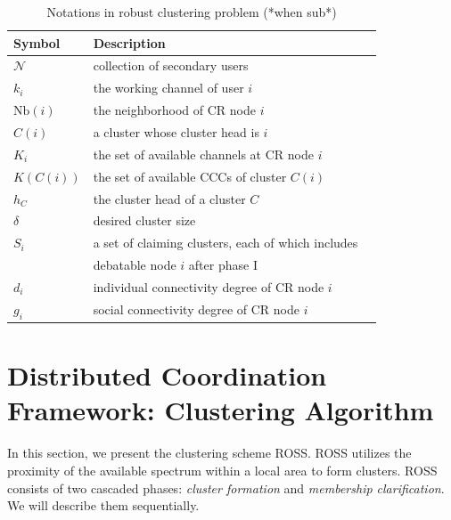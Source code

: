 \documentclass[10pt,journal,compsoc]{IEEEtran}
\theoremstyle{mytheoremstyle}
\theoremstyle{mytheoremstyle}
\theoremstyle{mytheoremstyle}
\begin{document}


\begin{table}[h!]
\caption{Notations in robust clustering problem (*when sub*)}
\label{tab1}
\centering
\begin{tabular}{llr}
\toprule
Symbol & Description \\
\midrule
$\mathcal{N}$  & collection of secondary users\\
$k_i$ & the working channel of user $i$\\
$\text{Nb}(i)$ & the neighborhood of CR node $i$    \\
$C(i)$ & a cluster whose cluster head is $i$  \\
$K_i$   & the set of available channels at CR node $i$  \\
$K(C(i))$   & the set of available CCCs of cluster $C(i)$ \\
$h_C$ & the cluster head of a cluster $C$\\
$\delta$ & desired cluster size\\
$S_i$ & a set of claiming clusters, each of which includes \\
& debatable node $i$ after phase I\\
$d_i$  & individual connectivity degree of CR node $i$\\
$g_i$  & social connectivity degree of CR node $i$\\
\bottomrule
\end{tabular}
\end{table}




\section{Distributed Coordination Framework: Clustering Algorithm}
\label{ross}

In this section, we present the clustering scheme ROSS.
ROSS utilizes the proximity of the available spectrum within a local area to form clusters.
ROSS consists of two cascaded phases: \textit{cluster formation} and \textit{membership clarification}.
We will describe them sequentially.
\end{document}
